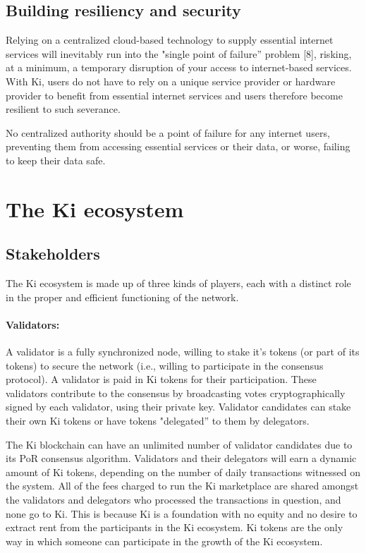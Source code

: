 \subsection{Building resiliency and security}
\label{sec:kidevicesecurity}
Relying on a centralized cloud-based technology to supply essential internet services will inevitably run into the "single point of failure'' problem [8], risking, at a minimum, a temporary disruption of your access to internet-based services. With Ki, users do not have to rely on a unique service provider or hardware provider to benefit from essential internet services and users therefore become resilient to such severance.

No centralized authority should be a point of failure for any internet users, preventing them from accessing essential services or their data, or worse, failing to keep their data safe.


\section{The Ki ecosystem }
\label{sec:kiecosystem}


\subsection{Stakeholders}
\label{sec:kiecosystemstakeholder}
The Ki ecosystem is made up of three kinds of players, each with a distinct role in the proper and efficient functioning of the network.

\paragraph{Validators:} A validator is a fully synchronized node, willing to stake it's tokens (or part of its tokens) to secure the network (i.e., willing to participate in the consensus protocol). A validator is paid in Ki tokens for their participation. These validators contribute to the consensus by broadcasting votes cryptographically signed by each validator, using their private key. Validator candidates can stake their own Ki tokens or have tokens "delegated'' to them by delegators.


The Ki blockchain can have an unlimited number of validator candidates due to its PoR consensus algorithm. Validators and their delegators will earn a dynamic amount of Ki tokens, depending on the number of daily transactions witnessed on the system. All of the fees charged to run the Ki marketplace are shared amongst the validators and delegators who processed the transactions in question, and none go to Ki. This is because Ki is a foundation with no equity and no desire to extract rent from the participants in the Ki ecosystem. Ki tokens are the only way in which someone can participate in the growth of the Ki ecosystem.

